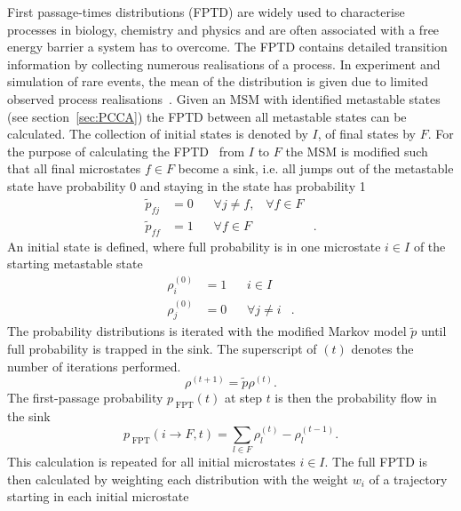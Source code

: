 First passage-times distributions (FPTD) are widely used to characterise processes in biology, chemistry and physics and are often associated with a free energy barrier a system has to overcome. The FPTD contains detailed transition information by collecting numerous realisations of a process. In experiment and simulation of rare events, the mean of the distribution is given due to limited observed process realisations~\cite{polizzi2016mean}.
Given an MSM with identified metastable states (see section~\ref{sec:PCCA}) the FPTD between all metastable states can be calculated. The collection of initial states is denoted by $I$, of final states by $F$.
For the purpose of calculating the FPTD~\cite{suarez2016estimating} from $I$ to $F$ the MSM is modified such that all final microstates $f \in F$ become a sink, i.e. all jumps out of the metastable state have probability 0 and staying in the state has probability 1
\begin{equation}
\begin{aligned}
\widetilde p_{fj} &= 0 \;\;\; &\forall j\neq f ,\;\;\; \forall f \in F& \\
\widetilde p_{ff} &= 1 \;\;\; &\forall f \in F&.
\end{aligned}
\end{equation}
An initial state is defined, where full probability is in one microstate $i \in I$ of the starting metastable state
\begin{equation}
\begin{aligned}
\rho_{i}^{(0)}  &= 1  \;\;\; & i \in I& \\
\rho_{j}^{(0)}  &= 0 \;\;\; &\forall j \neq i&.
\end{aligned}
\end{equation}
The probability distributions is iterated with the modified Markov model $\widetilde p$ until full probability is trapped in the sink. The superscript of $(t)$ denotes the number of iterations performed.
\begin{equation}
\rho^{(t+1)} = \widetilde p  \rho^{(t)} .
\end{equation}
The first-passage probability $p_{\;\text{FPT}}(t)$ at step $t$ is then the probability flow in the sink 
\begin{equation}
p_{\;\text{FPT}}(i \to F,t) = \sum_{l \in F} \rho^{(t)}_{l} - \rho^{(t-1)}_{l} .
\end{equation}
This calculation is repeated for all initial microstates $i \in I$. The full FPTD is then calculated by weighting each distribution with the weight $w_i$ of a trajectory starting in each initial microstate
